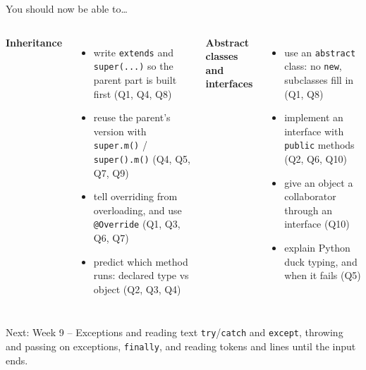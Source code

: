 \documentclass[aspectratio=169]{beamer}
\newcommand{\code}[1]{\texttt{#1}}
\newcommand{\neutrallabel}[1]{\textcolor{bkblue}{\textbf{#1}}}
\newcommand{\yes}{\textcolor{goodgreen}{\ding{51}}}
\begin{document}
\begin{frame}{You should now be able to\ldots}
  \begin{columns}[T,onlytextwidth]
    \neutrallabel{Inheritance}
    \begin{itemize}[itemsep=0.12em]
      \small
      \item[\yes] write \code{extends} and \code{super(...)} so the parent part is
            built first (Q1, Q4, Q8)
      \item[\yes] reuse the parent's version with \code{super.m()} /
            \code{super().m()} (Q4, Q5, Q7, Q9)
      \item[\yes] tell overriding from overloading, and use \code{@Override}
            (Q1, Q3, Q6, Q7)
      \item[\yes] predict which method runs: declared type vs object (Q2, Q3, Q4)
    \end{itemize}
    \neutrallabel{Abstract classes and interfaces}
    \begin{itemize}[itemsep=0.12em]
      \small
      \item[\yes] use an \code{abstract} class: no \code{new}, subclasses fill in
            (Q1, Q8)
      \item[\yes] implement an interface with \code{public} methods (Q2, Q6, Q10)
      \item[\yes] give an object a collaborator through an interface (Q10)
      \item[\yes] explain Python duck typing, and when it fails (Q5)
    \end{itemize}
  \end{columns}
  \vspace{0.3em}
  \begin{contextbox}{Next: Week 9 -- Exceptions and reading text}
    \footnotesize \code{try}/\code{catch} and \code{except}, throwing and passing on
    exceptions, \code{finally}, and reading tokens and lines until the input ends.
  \end{contextbox}
\end{frame}
\end{document}
